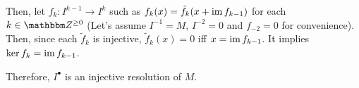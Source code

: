 Then, let \(f_k: I^{k - 1} \to I^k\) such as \(f_k(x) = \tilde f_k(x + \textnormal{im}\, f_{k - 1})\) for each \(k \in \bbZ^{\ge 0}\) (Let's assume \(I^{-1} = M\), \(I^{-2} = 0\) and \(f_{-2} = 0\) for convenience).
Then, since each \(\tilde f_k\) is injective, \(\tilde f_k (x) = 0\) iff \(x = \textnormal{im}\, f_{k - 1}\).
It implies \(\ker f_k = \textnormal{im}\, f_{k - 1}\).

Therefore, \(I^\bullet\) is an injective resolution of \(M\).
\qedsq
